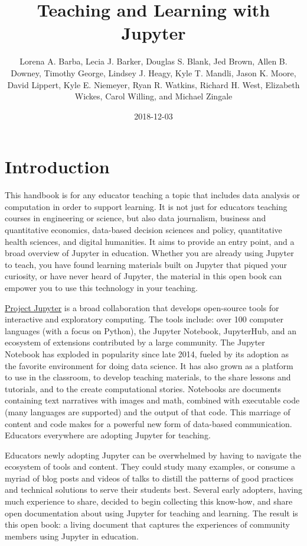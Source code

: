 \documentclass[]{book}
\title{Teaching and Learning with Jupyter}
\author{Lorena A. Barba, Lecia J. Barker, Douglas S. Blank, Jed Brown, Allen B.
Downey, Timothy George, Lindsey J. Heagy, Kyle T. Mandli, Jason K.
Moore, David Lippert, Kyle E. Niemeyer, Ryan R. Watkins, Richard H.
West, Elizabeth Wickes, Carol Willing, and Michael Zingale}
\date{2018-12-03}
\begin{document}
\maketitle

{
\setcounter{tocdepth}{1}
\tableofcontents
}
\chapter{Introduction}\label{intro}

This handbook is for any educator teaching a topic that includes data
analysis or computation in order to support learning. It is not just for
educators teaching courses in engineering or science, but also data
journalism, business and quantitative economics, data-based decision
sciences and policy, quantitative health sciences, and digital
humanities. It aims to provide an entry point, and a broad overview of
Jupyter in education. Whether you are already using Jupyter to teach,
you have found learning materials built on Jupyter that piqued your
curiosity, or have never heard of Jupyter, the material in this open
book can empower you to use this technology in your teaching.

\href{http://jupyter.org/}{Project Jupyter} is a broad collaboration
that develops open-source tools for interactive and exploratory
computing. The tools include: over 100 computer languages (with a focus
on Python), the Jupyter Notebook, JupyterHub, and an ecosystem of
extensions contributed by a large community. The Jupyter Notebook has
exploded in popularity since late 2014, fueled by its adoption as the
favorite environment for doing data science. It has also grown as a
platform to use in the classroom, to develop teaching materials, to the
share lessons and tutorials, and to the create computational stories.
Notebooks are documents containing text narratives with images and math,
combined with executable code (many languages are supported) and the
output of that code. This marriage of content and code makes for a
powerful new form of data-based communication. Educators everywhere are
adopting Jupyter for teaching.

Educators newly adopting Jupyter can be overwhelmed by having to
navigate the ecosystem of tools and content. They could study many
examples, or consume a myriad of blog posts and videos of talks to
distill the patterns of good practices and technical solutions to serve
their students best. Several early adopters, having much experience to
share, decided to begin collecting this know-how, and share open
documentation about using Jupyter for teaching and learning. The result
is this open book: a living document that captures the experiences of
community members using Jupyter in education.
\end{document}
